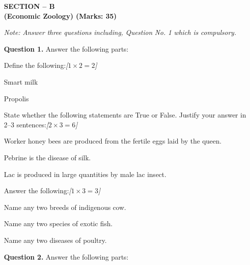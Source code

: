 \documentclass[11pt,a4paper]{article}
\newcommand{\pts}[1]{\hfill   \textit{[#1]}}
\begin{document}
\pagebreak

\begin{center}
   \textbf{SECTION -- B} \\
   \textbf{(Economic Zoology) (Marks: 35)}
\end{center}

\smallskip



\noindent   \textit{Note: Answer three questions including, Question No. 1 which is compulsory.}

\bigskip



\noindent   \textbf{Question 1.} Answer the following parts:

\begin{parts}
  \item Define the following:\pts{$1  \times 2 = 2$}
  
\begin{parts}
    \item Smart milk
    \item Propolis
  \end{parts}

  \item State whether the following statements are True or False. Justify your answer in 2--3 sentences:\pts{$2  \times 3 = 6$}
  
\begin{parts}
    \item Worker honey bees are produced from the fertile eggs laid by the queen.
    \item Pebrine is the disease of silk.
    \item Lac is produced in large quantities by male lac insect.
  \end{parts}

  \item Answer the following:\pts{$1  \times 3 = 3$}
  
\begin{parts}
    \item Name any two breeds of indigenous cow.
    \item Name any two species of exotic fish.
    \item Name any two diseases of poultry.
  \end{parts}
\end{parts}

\medskip


\noindent   \textbf{Question 2.} Answer the following parts:
\end{document}
